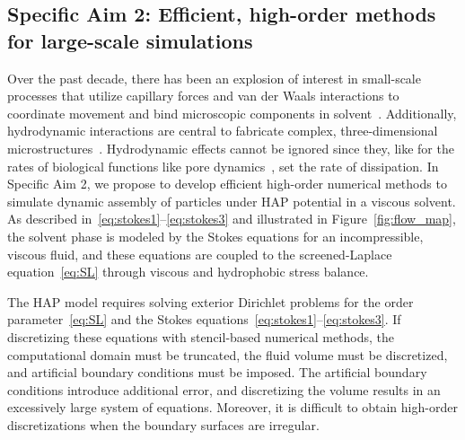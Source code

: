 \subsection{Specific Aim 2: Efficient, high-order methods for
large-scale simulations}
Over the past decade, there has been an explosion of interest in
small-scale processes that utilize capillary forces and van der Waals
interactions to coordinate movement and bind microscopic components in
solvent~\cite{Pandey2011, Zhang2017, Siontorou2017}. Additionally,
hydrodynamic interactions are central to fabricate complex,
three-dimensional microstructures~\cite{Dasgupta2017, Leong2007,
Reynolds2019, Cho2010}. Hydrodynamic effects cannot be ignored since
they, like for the rates of biological functions like pore
dynamics~\cite{RYHAM20112929}, set the rate of dissipation. In Specific
Aim 2, we propose to develop efficient high-order numerical methods to
simulate dynamic assembly of particles under HAP potential in a viscous
solvent. As described in~\eqref{eq:stokes1}--\eqref{eq:stokes3} and
illustrated in Figure~\ref{fig:flow_map}, the solvent phase is modeled
by the Stokes equations for an incompressible, viscous fluid, and these
equations are coupled to the screened-Laplace equation~\eqref{eq:SL}
through viscous and hydrophobic stress balance. 
 
The HAP model requires solving exterior Dirichlet problems for the order
parameter~\eqref{eq:SL} and the Stokes
equations~\eqref{eq:stokes1}--\eqref{eq:stokes3}. If discretizing these
equations with stencil-based numerical methods, the computational domain
must be truncated, the fluid volume must be discretized, and artificial
boundary conditions must be imposed. The artificial boundary conditions
introduce additional error, and discretizing the volume results in an
excessively large system of equations. Moreover, it is difficult to
obtain high-order discretizations when the boundary surfaces are
irregular. 

